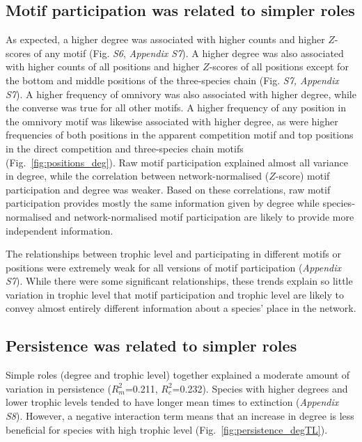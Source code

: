 \documentclass[12pt]{article}
\begin{document}
\begin{spacing}{1.0}
    \subsection*{Motif participation was related to simpler roles}    
    
        As expected, a higher degree was associated with higher counts and higher $Z$-scores of any motif (Fig. \emph{S6}, \emph{Appendix S7}).
        A higher degree was also associated with higher counts of all positions and higher $Z$-scores of all positions except for the bottom and middle positions of the three-species chain (Fig. \emph{S7, Appendix S7}).
        A higher frequency of omnivory was also associated with higher degree, while the converse was true for all other motifs.
        A higher frequency of any position in the omnivory motif was likewise associated with higher degree, as were higher frequencies of both positions in the apparent competition motif and top positions in the direct competition and three-species chain motifs (Fig.~\ref{fig:positions_deg}).
        Raw motif participation explained almost all variance in degree, while the correlation between network-normalised ($Z$-score) motif participation and degree was weaker.
        Based on these correlations, raw motif participation provides mostly the same information given by degree while species-normalised and network-normalised motif participation are likely to provide more independent information.
        
    
        The relationships between trophic level and participating in different motifs or positions were extremely weak for all versions of motif participation (\emph{Appendix S7}).
        While there were some significant relationships, these trends explain so little variation in trophic level that motif participation and trophic level are likely to convey almost entirely different information about a species' place in the network.
    

    \subsection*{Persistence was related to simpler roles}
    
        Simple roles (degree and trophic level) together explained a moderate amount of variation in persistence ($R^2_m$=0.211, $R^2_c$=0.232).
        Species with higher degrees and lower trophic levels tended to have longer mean times to extinction (\emph{Appendix S8}).
        However, a negative interaction term means that an increase in degree is less beneficial for species with high trophic level (Fig.~\ref{fig:persistence_degTL}).
    

\end{spacing}
\end{document}
